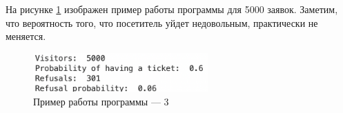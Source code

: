 \documentclass[12pt]{report}
\begin{document}
На рисунке \ref{fig:pic3} изображен пример работы программы для 5000 заявок. Заметим, что вероятность того, что посетитель уйдет недовольным, практически не меняется.

\begin{figure}[h!btp]
	\centering
	\includegraphics[width=0.6\textwidth]{inc/pic3.png}
	\caption{Пример работы программы --- 3}
	\label{fig:pic3}	
\end{figure}

	
\end{document}
